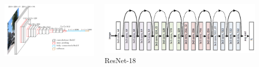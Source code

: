 \documentclass[usenames,dvipsnames]{beamer}
\begin{document}
    \begin{frame}{\secname}{\subsecname}
        \vspace{-1em}
        \begin{columns}
            \begin{column}{0.5\textwidth}
                \begin{center}
                    \includegraphics[width=\linewidth]{figures/Going_deeper/vgg16.png}\\ \vspace{-1.5em}{\tiny VGG-16}
                \end{center}
            \end{column}
            \begin{column}{0.5\textwidth}
                \begin{center}
                    \includegraphics[width=\linewidth]{figures/Going_deeper/resnet18.png} \\ \vspace{-0.8em} {\tiny ResNet-18}
                \end{center}
            \end{column}
        \end{columns}
        \begin{columns}
            \begin{column}{0.7\textwidth}
                \begin{center}

\end{center}
\end{column}
\end{columns}
\end{frame}
\end{document}
